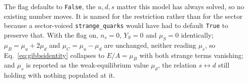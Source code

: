 \documentclass[aps,prc,onecolumn,superscriptaddress,nofootinbib,10pt]{revtex4-2}
\begin{document}
The flag defaults to \texttt{False}, the $u,d,s$ matter this model has always
solved, so no existing number moves. It is named for the restriction rather
than for the sector because a sector-voiced \texttt{strange\_quarks} would have
had to default \texttt{True} to preserve that. With the flag on, $n_s = 0$,
$Y_S = 0$ and $\mu_S = 0$ identically; $\mu_B = \mu_u + 2\mu_d$ and
$\mu_C = \mu_u - \mu_d$ are unchanged, neither reading $\mu_s$, so
Eq.~\eqref{eq:gibbsidentity} collapses to $E/A = \mu_B$ with both strange terms
vanishing; and $\mu_s$ is reported as the weak-equilibrium value $\mu_d$, the
relation $s \leftrightarrow d$ still holding with nothing populated at it.



\end{document}
